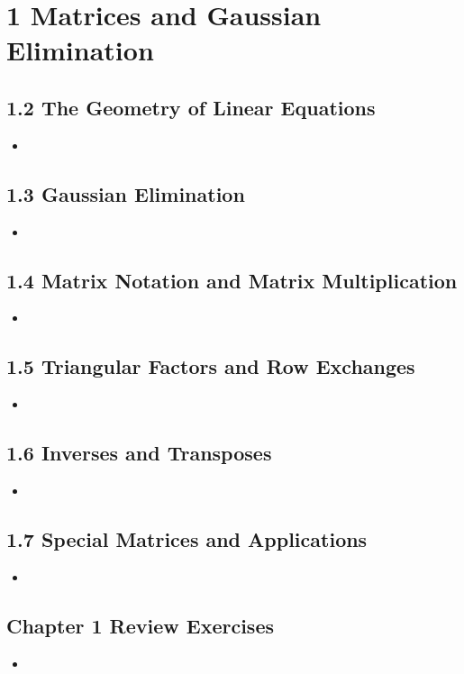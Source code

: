 \chapter{1 Matrices and Gaussian Elimination}

\section{1.2 The Geometry of Linear Equations}
\begin{itemize}
  \item []

\end{itemize}

\section{1.3 Gaussian Elimination}
\begin{itemize}
  \item []

\end{itemize}

\section{1.4 Matrix Notation and Matrix Multiplication}
\begin{itemize}
  \item []

\end{itemize}

\section{1.5 Triangular Factors and Row Exchanges}
\begin{itemize}
  \item []

\end{itemize}

\section{1.6 Inverses and Transposes}
\begin{itemize}
  \item []

\end{itemize}

\section{1.7 Special Matrices and Applications}
\begin{itemize}
  \item []


\end{itemize}

\section{Chapter 1 Review Exercises}
\begin{itemize}
  \item []


\end{itemize}


